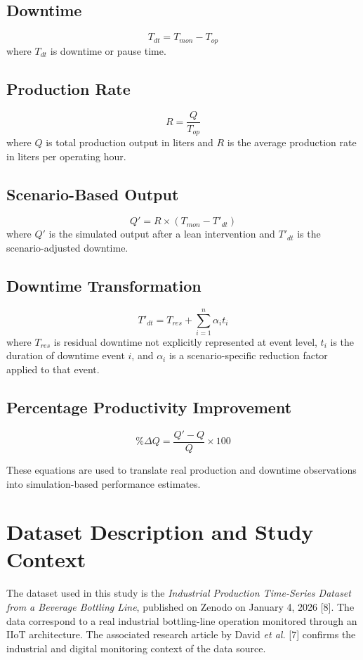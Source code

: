 \documentclass[12pt,a4paper]{article}
\begin{document}
\subsection{Downtime}
\begin{equation}
T_{dt} = T_{mon} - T_{op}
\end{equation}
where $T_{dt}$ is downtime or pause time.

\subsection{Production Rate}
\begin{equation}
R = \frac{Q}{T_{op}}
\end{equation}
where $Q$ is total production output in liters and $R$ is the average production rate in liters per operating hour.

\subsection{Scenario-Based Output}
\begin{equation}
Q' = R \times (T_{mon} - T'_{dt})
\end{equation}
where $Q'$ is the simulated output after a lean intervention and $T'_{dt}$ is the scenario-adjusted downtime.

\subsection{Downtime Transformation}
\begin{equation}
T'_{dt} = T_{res} + \sum_{i=1}^{n}\alpha_i t_i
\end{equation}
where $T_{res}$ is residual downtime not explicitly represented at event level, $t_i$ is the duration of downtime event $i$, and $\alpha_i$ is a scenario-specific reduction factor applied to that event.

\subsection{Percentage Productivity Improvement}
\begin{equation}
\%\Delta Q = \frac{Q' - Q}{Q}\times 100
\end{equation}

These equations are used to translate real production and downtime observations into simulation-based performance estimates.

\section{Dataset Description and Study Context}
The dataset used in this study is the \textit{Industrial Production Time-Series Dataset from a Beverage Bottling Line}, published on Zenodo on January 4, 2026 [8]. The data correspond to a real industrial bottling-line operation monitored through an IIoT architecture. The associated research article by David \emph{et al.} [7] confirms the industrial and digital monitoring context of the data source.
\end{document}
